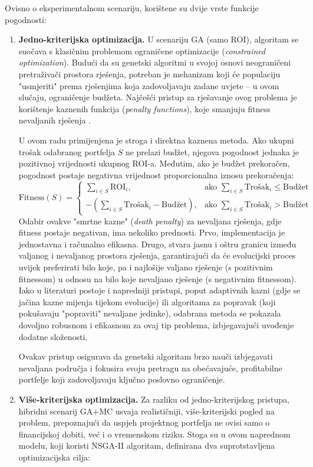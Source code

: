 Ovisno o eksperimentalnom scenariju, korištene su dvije vrste funkcije pogodnosti:
\begin{enumerate}
    \item \textbf{Jedno-kriterijska optimizacija.}  
U scenariju GA (samo ROI), algoritam se suočava s klasičnim problemom ograničene optimizacije (\textit{constrained optimization}). Budući da su genetski algoritmi u svojoj osnovi neograničeni pretraživači prostora rješenja, potreban je mehanizam koji će populaciju "usmjeriti" prema rješenjima koja zadovoljavaju zadane uvjete – u ovom slučaju, ograničenje budžeta. Najčešći pristup za rješavanje ovog problema je korištenje kaznenih funkcija (\textit{penalty functions}), koje smanjuju fitness nevaljanih rješenja \cite{Goldberg1989}.

U ovom radu primijenjena je stroga i direktna kaznena metoda. Ako ukupni trošak odabranog portfelja $S$ ne prelazi budžet, njegova pogodnost jednaka je pozitivnoj vrijednosti ukupnog ROI-a. Međutim, ako je budžet prekoračen, pogodnost postaje negativna vrijednost proporcionalna iznosu prekoračenja:
$$
\text{Fitness}(S) = 
\begin{cases}
    \sum_{i \in S} \text{ROI}_i, & \text{ako } \sum_{i \in S} \text{Trošak}_i \leq \text{Budžet} \\
    -(\sum_{i \in S} \text{Trošak}_i - \text{Budžet}), & \text{ako } \sum_{i \in S} \text{Trošak}_i > \text{Budžet}
\end{cases}
$$
Odabir ovakve "smrtne kazne" (\textit{death penalty}) za nevaljana rješenja, gdje fitness postaje negativan, ima nekoliko prednosti. Prvo, implementacija je jednostavna i računalno efikasna. Drugo, stvara jasnu i oštru granicu između valjanog i nevaljanog prostora rješenja, garantirajući da će evolucijski proces uvijek preferirati bilo koje, pa i najlošije valjano rješenje (s pozitivnim fitnessom) u odnosu na bilo koje nevaljano rješenje (s negativnim fitnessom). Iako u literaturi postoje i napredniji pristupi, poput adaptivnih kazni (gdje se jačina kazne mijenja tijekom evolucije) ili algoritama za popravak (koji pokušavaju "popraviti" nevaljane jedinke), odabrana metoda se pokazala dovoljno robusnom i efikasnom za ovaj tip problema, izbjegavajući uvođenje dodatne složenosti.

Ovakav pristup osigurava da genetski algoritam brzo nauči izbjegavati nevaljana područja i fokusira svoju pretragu na obećavajuće, profitabilne portfelje koji zadovoljavaju ključno poslovno ograničenje.

    \item \textbf{Više-kriterijska optimizacija.}  
Za razliku od jedno-kriterijskog pristupa, hibridni scenarij GA+MC usvaja realističniji, više-kriterijski pogled na problem, prepoznajući da uspjeh projektnog portfelja ne ovisi samo o financijskoj dobiti, već i o vremenskom riziku. Stoga su u ovom naprednom modelu, koji koristi NSGA-II algoritam, definirana dva suprotstavljena optimizacijska cilja:


\end{enumerate}
